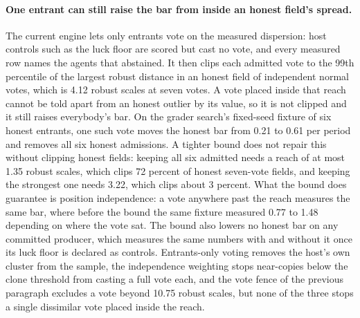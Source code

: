 \paragraph{One entrant can still raise the bar from inside an honest field's spread.} The current engine lets only entrants vote on the measured dispersion: host controls such as the luck floor are scored but cast no vote, and every measured row names the agents that abstained. It then clips each admitted vote to the 99th percentile of the largest robust distance in an honest field of independent normal votes, which is 4.12 robust scales at seven votes. A vote placed inside that reach cannot be told apart from an honest outlier by its value, so it is not clipped and it still raises everybody's bar. On the grader search's fixed-seed fixture of six honest entrants, one such vote moves the honest bar from 0.21 to 0.61 per period and removes all six honest admissions. A tighter bound does not repair this without clipping honest fields: keeping all six admitted needs a reach of at most 1.35 robust scales, which clips 72 percent of honest seven-vote fields, and keeping the strongest one needs 3.22, which clips about 3 percent. What the bound does guarantee is position independence: a vote anywhere past the reach measures the same bar, where before the bound the same fixture measured 0.77 to 1.48 depending on where the vote sat. The bound also lowers no honest bar on any committed producer, which measures the same numbers with and without it once its luck floor is declared as controls. Entrants-only voting removes the host's own cluster from the sample, the independence weighting stops near-copies below the clone threshold from casting a full vote each, and the vote fence of the previous paragraph excludes a vote beyond 10.75 robust scales, but none of the three stops a single dissimilar vote placed inside the reach.

